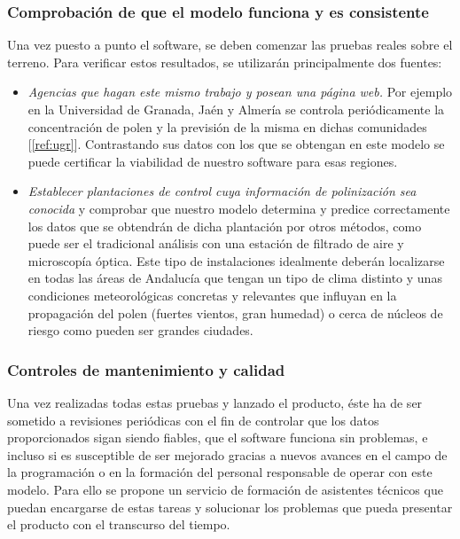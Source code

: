 \documentclass[12pt,oneside,a4paper]{article}
\numberwithin{figure}{section}
\begin{document}
\subsubsection{Comprobación de que el modelo funciona y es consistente}

Una vez puesto a punto el software, se deben comenzar las pruebas reales sobre el terreno. Para verificar estos resultados, se utilizarán principalmente dos fuentes:

\begin{itemize}
\item \textit{Agencias que hagan este mismo trabajo y posean una página web.} Por ejemplo en la Universidad de Granada, Jaén y Almería se controla periódicamente la concentración de polen y la previsión de la misma en dichas comunidades [\ref{ref:ugr}]. Contrastando sus datos con los que se obtengan en este modelo se puede certificar la viabilidad de nuestro software para esas regiones.
\item \textit{Establecer plantaciones de control cuya información de polinización sea conocida} y comprobar que nuestro modelo determina y predice correctamente los datos que se obtendrán de dicha plantación por otros métodos, como puede ser el tradicional análisis con una estación de filtrado de aire y microscopía óptica. Este tipo de instalaciones idealmente deberán localizarse en todas las áreas de Andalucía que tengan un tipo de clima distinto y unas condiciones meteorológicas concretas y relevantes que influyan en la propagación del polen (fuertes vientos, gran humedad) o cerca de núcleos de riesgo como pueden ser grandes ciudades.
\end{itemize}

\subsubsection{Controles de mantenimiento y calidad}

Una vez realizadas todas estas pruebas y lanzado el producto, éste ha de ser sometido a revisiones periódicas con el fin de controlar que los datos proporcionados sigan siendo fiables, que el software funciona sin problemas, e incluso si es susceptible de ser mejorado gracias a nuevos avances en el campo de la programación o en la formación del personal responsable de operar con este modelo.
Para ello se propone un servicio de formación de asistentes técnicos que puedan encargarse de estas tareas y solucionar los problemas que pueda presentar el producto con el transcurso del tiempo. 
\end{document}
